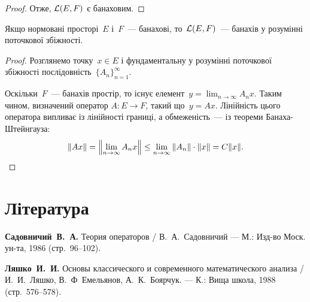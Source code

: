 \begin{proof}
Отже, $\mathcal{L}(E, F)$ є банаховим. 
\end{proof}

\begin{theorem}
Якщо нормовані просторі~$E$ і~$F$~--- банахові,
то~$\mathcal{L}(E, F)$~--- банахів у розумінні поточкової збіжності.
\end{theorem}

\begin{proof}
Розглянемо точку~$x \in E$ і фундаментальну у
розумінні поточкової збіжності послідовність~$\{A_n\}_{n = 1}^\infty$.

Оскільки~$F$~--- банахів простір, то існує елемент~$y = \lim_{n \to \infty} A_n x$.
Таким чином, визначений оператор
$A: E \to F$, такий що~$y = Ax$. Лінійність цього оператора
випливає із лінійності границі, а обмеженість~--- із теореми
Банаха-Штейнгауза:
\begin{equation*}
    \|A x\| =
    \left\| \lim_{n \to \infty} A_n x\right\| \le
    \lim_{n \to \infty} \|A_n\| \cdot \|x\| =
    C \|x\|. \qedhere
\end{equation*}
\end{proof}

\section{Література}

\begin{enumerate}[label={[\arabic*]}]
\item \textbf{Садовничий~В.~А.}
Теория операторов /
В.~А.~Садовничий ---
М.: Изд-во Моск. ун-та, 1986 (стр.~96--102).
\item \textbf{Ляшко~И.~И.}
Основы классического и современного математического анализа /
И.~И.~Ляшко, В.~Ф~Емельянов, А.~К.~Боярчук. ---
К.: Вища школа, 1988 (стр.~576--578).
\end{enumerate}
